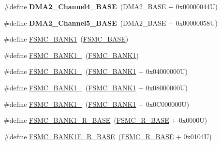 \begin{DoxyCompactItemize}
\item 
\hypertarget{group___peripheral__memory__map_ga01b063266473f290a55047654fbbfbee}{\#define {\bfseries D\-M\-A2\-\_\-\-Channel4\-\_\-\-B\-A\-S\-E}~(D\-M\-A2\-\_\-\-B\-A\-S\-E + 0x00000044\-U)}\label{group___peripheral__memory__map_ga01b063266473f290a55047654fbbfbee}

\item 
\hypertarget{group___peripheral__memory__map_ga1eea983a5d68bf36f4d19fbb07955ca1}{\#define {\bfseries D\-M\-A2\-\_\-\-Channel5\-\_\-\-B\-A\-S\-E}~(D\-M\-A2\-\_\-\-B\-A\-S\-E + 0x00000058\-U)}\label{group___peripheral__memory__map_ga1eea983a5d68bf36f4d19fbb07955ca1}

\item 
\#define \hyperlink{group___peripheral__memory__map_gad9f1205bd4a5a87047167cfd08c621be}{F\-S\-M\-C\-\_\-\-B\-A\-N\-K1}~(\hyperlink{group___peripheral__memory__map_ga679200df61ecb0695d72c030fdeb50a9}{F\-S\-M\-C\-\_\-\-B\-A\-S\-E})
\item 
\#define \hyperlink{group___peripheral__memory__map_gab711931ab21fd2a4f74a673d5256e113}{F\-S\-M\-C\-\_\-\-B\-A\-N\-K1\-\_}~(\hyperlink{group___peripheral__memory__map_gad9f1205bd4a5a87047167cfd08c621be}{F\-S\-M\-C\-\_\-\-B\-A\-N\-K1})
\item 
\#define \hyperlink{group___peripheral__memory__map_gadc659d72d6ff27f3b37b1acaa430655e}{F\-S\-M\-C\-\_\-\-B\-A\-N\-K1\-\_}~(\hyperlink{group___peripheral__memory__map_gad9f1205bd4a5a87047167cfd08c621be}{F\-S\-M\-C\-\_\-\-B\-A\-N\-K1} + 0x04000000\-U)
\item 
\#define \hyperlink{group___peripheral__memory__map_ga53c3a83da3ccbaf54880dde30df549e7}{F\-S\-M\-C\-\_\-\-B\-A\-N\-K1\-\_}~(\hyperlink{group___peripheral__memory__map_gad9f1205bd4a5a87047167cfd08c621be}{F\-S\-M\-C\-\_\-\-B\-A\-N\-K1} + 0x08000000\-U)
\item 
\#define \hyperlink{group___peripheral__memory__map_ga4fe30cb75e7817aa7a1799ec5c18c842}{F\-S\-M\-C\-\_\-\-B\-A\-N\-K1\-\_}~(\hyperlink{group___peripheral__memory__map_gad9f1205bd4a5a87047167cfd08c621be}{F\-S\-M\-C\-\_\-\-B\-A\-N\-K1} + 0x0\-C000000\-U)
\item 
\#define \hyperlink{group___peripheral__memory__map_ga48d8f80d608b64cb42e7ed223066f856}{F\-S\-M\-C\-\_\-\-B\-A\-N\-K1\-\_\-\-R\-\_\-\-B\-A\-S\-E}~(\hyperlink{group___peripheral__memory__map_gaddf0e199dccba83272b20c9fb4d3aaed}{F\-S\-M\-C\-\_\-\-R\-\_\-\-B\-A\-S\-E} + 0x0000\-U)
\item 
\#define \hyperlink{group___peripheral__memory__map_gaa2ebab683a214fe3b0c628228bff3724}{F\-S\-M\-C\-\_\-\-B\-A\-N\-K1\-E\-\_\-\-R\-\_\-\-B\-A\-S\-E}~(\hyperlink{group___peripheral__memory__map_gaddf0e199dccba83272b20c9fb4d3aaed}{F\-S\-M\-C\-\_\-\-R\-\_\-\-B\-A\-S\-E} + 0x0104\-U)

\end{DoxyCompactItemize}
